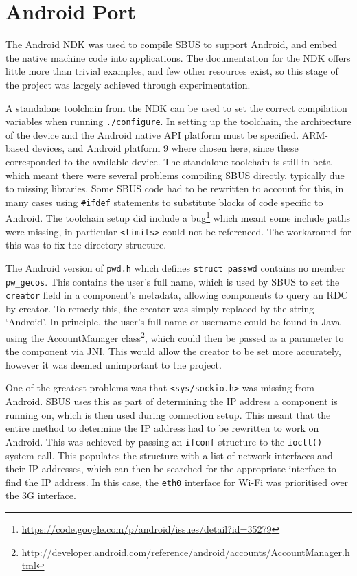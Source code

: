 \documentclass[12pt,twoside,notitlepage]{report}
\begin{document}
\section{Android Port}

The Android NDK was used to compile SBUS to support Android, and embed the native machine code into applications. 
The documentation for the NDK offers little more than trivial examples, and few other resources exist, so this stage of the project was largely achieved through experimentation. 

A standalone toolchain from the NDK can be used to set the correct compilation variables when running {\tt ./configure}. 
In setting up the toolchain, the architecture of the device and the Android native API platform must be specified. 
ARM-based devices, and Android platform 9 where chosen here, since these corresponded to the available device. 
The standalone toolchain is still in beta which meant there were several problems compiling SBUS directly, typically due to missing libraries. 
Some SBUS code had to be rewritten to account for this, in many cases using {\tt \#ifdef} statements to substitute blocks of code specific to Android. 
The toolchain setup did include a bug\footnote{\url{https://code.google.com/p/android/issues/detail?id=35279}} which meant some include paths were missing, in particular {\tt <limits>} could not be referenced. 
The workaround for this was to fix the directory structure.

The Android version of {\tt pwd.h} which defines {\tt struct passwd} contains no member {\tt pw\_gecos}. 
This contains the user's full name, which is used by SBUS to set the {\tt creator} field in a component's metadata, allowing components to query an RDC by creator. 
To remedy this, the creator was simply replaced by the string `Android'. 
In principle, the user's full name or username could be found in Java using the AccountManager class\footnote{\url{http://developer.android.com/reference/android/accounts/AccountManager.html}}, which could then be passed as a parameter to the component via JNI. 
This would allow the creator to be set more accurately, however it was deemed unimportant to the project. 

One of the greatest problems was that {\tt <sys/sockio.h>} was missing from Android.
SBUS uses this as part of determining the IP address a component is running on, which is then used during connection setup. 
This meant that the entire method to determine the IP address had to be rewritten to work on Android. 
This was achieved by passing an {\tt ifconf} structure to the {\tt ioctl()} system call.
This populates the structure with a list of network interfaces and their IP addresses, which can then be searched for the appropriate interface to find the IP address. 
In this case, the {\tt eth0} interface for Wi-Fi was prioritised over the 3G interface.
\end{document}
